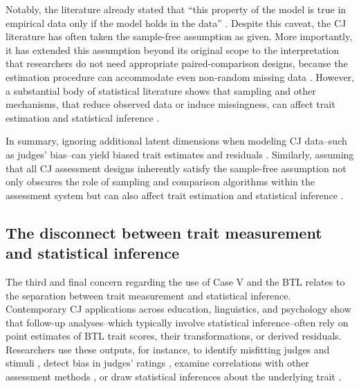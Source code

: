 \documentclass[
  authoryear,
  review,
  1p]{elsarticle}
\begin{document}
Notably, the literature already stated that ``this property of the model
is true in empirical data only if the model holds in the data''
\citep[p.~459]{Andrich_1978}. Despite this caveat, the CJ literature has
often taken the sample-free assumption as given. More importantly, it
has extended this assumption beyond its original scope to the
interpretation that researchers do not need appropriate
paired-comparison designs, because the estimation procedure can
accommodate even non-random missing data \citep{Bramley_2008}. However,
a substantial body of statistical literature shows that sampling and
other mechanisms, that reduce observed data or induce missingness, can
affect trait estimation and statistical inference
\citetext{\citealp[see,][]{Kohler_et_al_2019}; \citealp[chap.~15]{McElreath_2020}; \citealp{Schuessler_et_al_2023}}.

In summary, ignoring additional latent dimensions when modeling CJ
data--such as judges' bias--can yield biased trait estimates and
residuals
\citep{Reckase_et_al_1986, Ackerman_1989, Kahraman_2013, Hoyle_et_al_2023}.
Similarly, assuming that all CJ assessment designs inherently satisfy
the sample-free assumption not only obscures the role of sampling and
comparison algorithms within the assessment system but can also affect
trait estimation and statistical inference
\citetext{\citealp{Kohler_et_al_2019}; \citealp[chap.~15]{McElreath_2020}; \citealp{Schuessler_et_al_2023}}.

\subsection{The disconnect between trait measurement and statistical
inference}\label{sec-theory-issue3}

The third and final concern regarding the use of Case V and the BTL
relates to the separation between trait measurement and statistical
inference. Contemporary CJ applications across education, linguistics,
and psychology show that follow-up analyses--which typically involve
statistical inference--often rely on point estimates of BTL trait
scores, their transformations, or derived residuals. Researchers use
these outputs, for instance, to identify misfitting judges and stimuli
\citep{Pollitt_2012b, vanDaal_et_al_2016, Goossens_et_al_2018}, detect
bias in judges' ratings
\citep{Pollitt_et_al_2003, Pollitt_2012b, Wu_2025}, examine correlations
with other assessment methods
\citep{Goossens_et_al_2018, Bouwer_et_al_2023}, or draw statistical
inferences about the underlying trait
\citep{Casalicchio_et_al_2015, Bramley_et_al_2019, Boonen_et_al_2020, Bouwer_et_al_2023, vanDaal_et_al_2017, Jones_et_al_2019, Gijsen_et_al_2021}.
\end{document}
